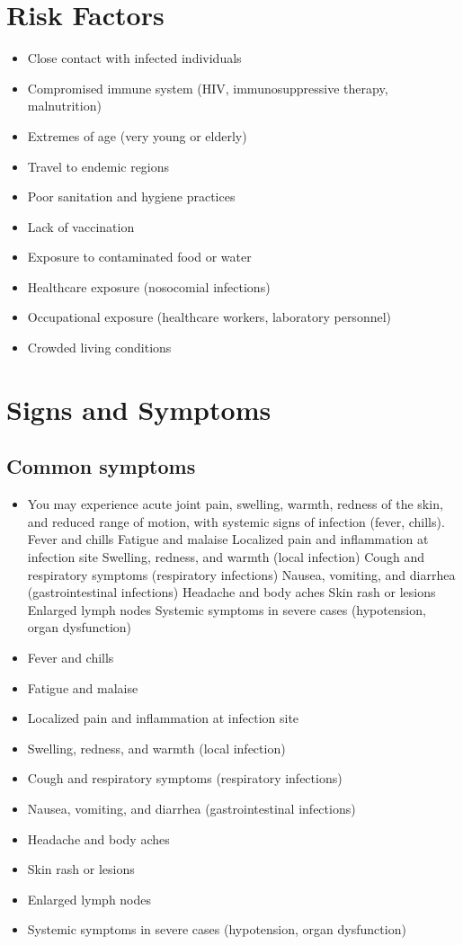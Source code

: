 \section{Risk Factors}

\begin{itemize}[noitemsep]
  \item Close contact with infected individuals
  \item Compromised immune system (HIV, immunosuppressive therapy, malnutrition)
  \item Extremes of age (very young or elderly)
  \item Travel to endemic regions
  \item Poor sanitation and hygiene practices
  \item Lack of vaccination
  \item Exposure to contaminated food or water
  \item Healthcare exposure (nosocomial infections)
  \item Occupational exposure (healthcare workers, laboratory personnel)
  \item Crowded living conditions
\end{itemize}
\section{Signs and Symptoms}

\subsection{Common symptoms}
\begin{itemize}[noitemsep]
  \item You may experience acute joint pain, swelling, warmth, redness of the skin, and reduced range of motion, with systemic signs of infection (fever, chills). Fever and chills Fatigue and malaise Localized pain and inflammation at infection site Swelling, redness, and warmth (local infection) Cough and respiratory symptoms (respiratory infections) Nausea, vomiting, and diarrhea (gastrointestinal infections) Headache and body aches Skin rash or lesions Enlarged lymph nodes Systemic symptoms in severe cases (hypotension, organ dysfunction)
  \item Fever and chills
  \item Fatigue and malaise
  \item Localized pain and inflammation at infection site
  \item Swelling, redness, and warmth (local infection)
  \item Cough and respiratory symptoms (respiratory infections)
  \item Nausea, vomiting, and diarrhea (gastrointestinal infections)
  \item Headache and body aches
  \item Skin rash or lesions
  \item Enlarged lymph nodes
  \item Systemic symptoms in severe cases (hypotension, organ dysfunction)
\end{itemize}

